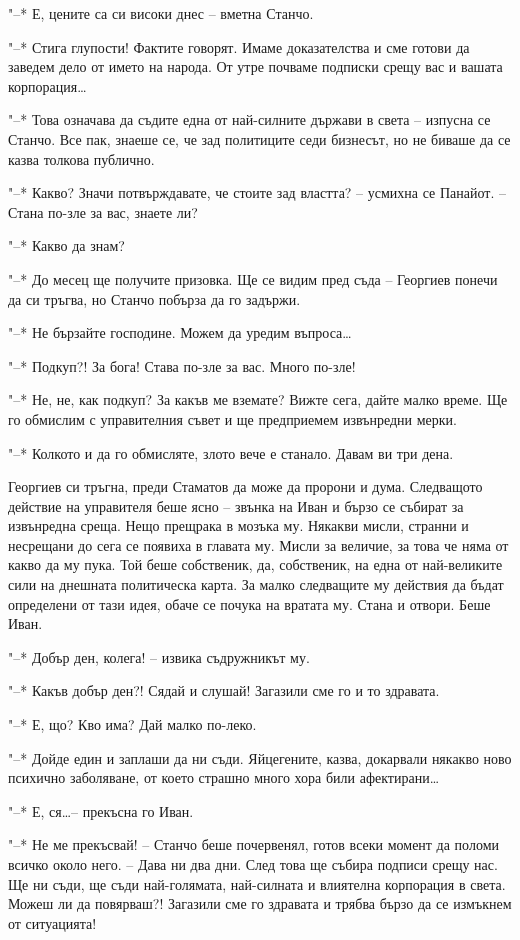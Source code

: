 \documentclass[ebook,openany,12pt]{memoir}
\begin{document}
"--* Е, цените са си високи днес – вметна Станчо.

"--* Стига глупости! Фактите говорят. Имаме доказателства и сме готови да заведем дело от името на народа. От утре почваме подписки срещу вас и вашата корпорация\ldots

"--* Това означава да съдите една от най-силните държави в света – изпусна се Станчо. Все пак, знаеше се, че зад политиците седи бизнесът, но не биваше да се казва толкова публично.

"--* Какво? Значи потвърждавате, че стоите зад властта? – усмихна се Панайот. – Стана по-зле за вас, знаете ли?

"--* Какво да знам?

"--* До месец ще получите призовка. Ще се видим пред съда – Георгиев понечи да си тръгва, но Станчо побърза да го задържи.

"--* Не бързайте господине. Можем да уредим въпроса\ldots

"--* Подкуп?! За бога! Става по-зле за вас. Много по-зле!

"--* Не, не, как подкуп? За какъв ме вземате? Вижте сега, дайте малко време. Ще го обмислим с управителния съвет и ще предприемем извънредни мерки.

"--* Колкото и да го обмисляте, злото вече е станало. Давам ви три дена. 

Георгиев си тръгна, преди Стаматов да може да пророни и дума. Следващото действие на управителя беше ясно – звънка на Иван и бързо се събират за извънредна среща. Нещо прещрака в мозъка му. Някакви мисли, странни и несрещани до сега се появиха в главата му. Мисли за величие, за това че няма от какво да му пука. Той беше собственик, да, собственик, на една от най-великите сили на днешната политическа карта. За малко следващите му действия да бъдат определени от тази идея, обаче се почука на вратата му. Стана и отвори. Беше Иван.

"--* Добър ден, колега! – извика съдружникът му.

"--* Какъв добър ден?! Сядай и слушай! Загазили сме го и то здравата.

"--* Е, що? Кво има? Дай малко по-леко.

"--* Дойде един и заплаши да ни съди. Яйцегените, казва, докарвали някакво ново психично заболяване, от което страшно много хора били афектирани\ldots

"--* Е, ся\ldots – прекъсна го Иван.

"--* Не ме прекъсвай! – Станчо беше почервенял, готов всеки момент да поломи всичко около него. – Дава ни два дни. След това ще събира подписи срещу нас. Ще ни съди, ще съди най-голямата, най-силната и влиятелна корпорация в света. Можеш ли да повярваш?! Загазили сме го здравата и трябва бързо да се измъкнем от ситуацията!
\end{document}
